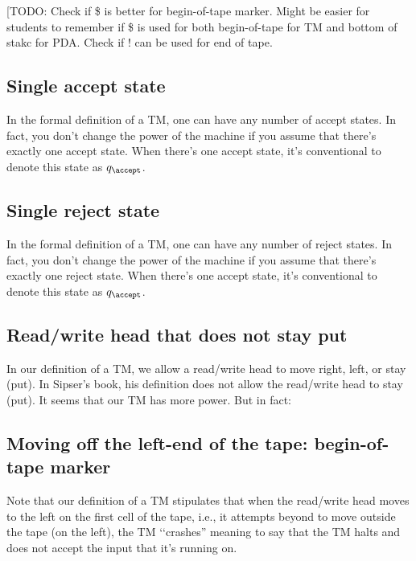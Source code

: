 [TODO: Check if \$ is better for begin-of-tape marker.
Might be easier for students to remember if \$ is used for
both begin-of-tape for TM and bottom of stakc for PDA.
Check if ! can be used for end of tape.

\newpage
\subsection{Single accept state}

In the formal definition of a TM, one can have any number of accept states.
In fact, you don't change the power of the machine if you assume that
there's exactly one accept state.
When there's one accept state, it's conventional to denote this
state as $q_\accept$.



\newpage
\subsection{Single reject state}

In the formal definition of a TM, one can have any number of reject states.
In fact, you don't change the power of the machine if you assume that
there's exactly one reject state.
When there's one accept state, it's conventional to denote this
state as $q_\accept$.




  
\newpage
\subsection{Read/write head that does not stay put}

In our definition of a TM, we allow a read/write head to move right, left,
or stay (put).
In Sipser's book, his definition does not allow the read/write head to
stay (put).
It seems that our TM has more power.
But in fact:



\newpage
\subsection{Moving off the left-end of the tape: begin-of-tape marker}

Note that our definition of a TM stipulates that when the read/write
head moves to the left on the first cell of the tape, i.e.,
it attempts beyond to move outside the tape (on the left),
the TM \lq\lq crashes'' meaning to say that
the TM halts and does not accept the input that it's running on.

